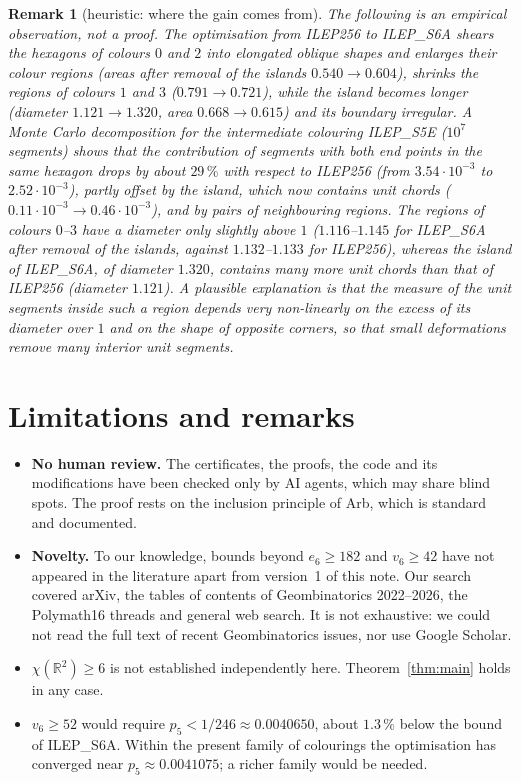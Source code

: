 \documentclass[10pt,a4paper]{article}
\newtheorem*{remark}{Remark}
\newcommand{\R}{\mathbb{R}}
\begin{document}
\begin{remark}[heuristic: where the gain comes from]
The following is an empirical observation, not a proof. The optimisation from ILEP256 to ILEP\_S6A shears the
hexagons of colours $0$ and $2$ into elongated oblique shapes and enlarges their colour regions (areas after
removal of the islands $0.540\to0.604$), shrinks the regions of colours $1$ and $3$ ($0.791\to0.721$), while the
island becomes longer (diameter $1.121\to1.320$, area $0.668\to0.615$) and its boundary irregular. A Monte Carlo decomposition for the intermediate colouring ILEP\_S5E ($10^7$ segments) shows that the
contribution of segments with both end points in the same hexagon drops by about $29\,\%$ with respect to
ILEP256 (from $3.54\cdot10^{-3}$ to $2.52\cdot10^{-3}$), partly offset by the island, which now contains unit
chords ($0.11\cdot10^{-3}\to0.46\cdot10^{-3}$), and by pairs of neighbouring regions. The regions of colours $0$--$3$
have a diameter only slightly above $1$ ($1.116$--$1.145$ for ILEP\_S6A after removal of the islands, against
$1.132$--$1.133$ for ILEP256), whereas the island of ILEP\_S6A, of diameter $1.320$, contains many more unit
chords than that of ILEP256 (diameter $1.121$). A plausible explanation is
that the measure of the unit segments inside such a region depends very non-linearly on the excess of its
diameter over $1$ and on the shape of opposite corners, so that small deformations remove many interior unit
segments.
\end{remark}

\section{Limitations and remarks}

\begin{itemize}
\item \textbf{No human review.} The certificates, the proofs, the code and its modifications have been checked
only by AI agents, which may share blind spots. The proof rests on the inclusion principle of Arb, which is
standard and documented.
\item \textbf{Novelty.} To our knowledge, bounds beyond $e_6\ge182$ and $v_6\ge42$ have not appeared in the
literature apart from version~1 of this note. Our search covered arXiv, the tables of contents of
Geombinatorics 2022--2026, the Polymath16 threads and general web search. It is not exhaustive: we could not
read the full text of recent Geombinatorics issues, nor use Google Scholar.
\item \textbf{$\chi(\R^2)\ge6$} is not established independently here. Theorem~\ref{thm:main} holds in
any case.
\item \textbf{$v_6\ge52$} would require $p_5<1/246\approx0.0040650$, about $1.3\,\%$ below the bound of
ILEP\_S6A. Within the present family of colourings the optimisation has converged near $p_5\approx0.0041075$;
a richer family would be needed.
\end{itemize}
\end{document}
